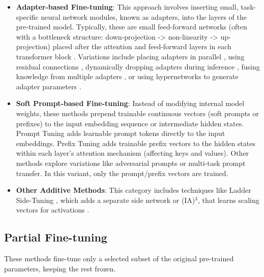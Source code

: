 \begin{itemize}
    \item \textbf{Adapter-based Fine-tuning}: This approach involves inserting small, task-specific neural network modules, known as adapters, into the layers of the pre-trained model. Typically, these are small feed-forward networks (often with a bottleneck structure: down-projection -> non-linearity -> up-projection) placed after the attention and feed-forward layers in each transformer block \cite{houlsby2019parameterefficient}. Variations include placing adapters in parallel \cite{he2021unified}, using residual connections \cite{Lin_2020}, dynamically dropping adapters during inference \cite{ruckle-etal-2021-adapterdrop}, fusing knowledge from multiple adapters \cite{pfeiffer-etal-2021-adapterfusion}, or using hypernetworks to generate adapter parameters \cite{he2022hyperprompt}.

    \item \textbf{Soft Prompt-based Fine-tuning}: Instead of modifying internal model weights, these methods prepend trainable continuous vectors (soft prompts or prefixes) to the input embedding sequence or intermediate hidden states. Prompt Tuning \cite{lester-etal-2021-power} adds learnable prompt tokens directly to the input embeddings. Prefix Tuning \cite{li-liang-2021-prefix} adds trainable prefix vectors to the hidden states within each layer's attention mechanism (affecting keys and values). Other methods explore variations like adversarial prompts or multi-task prompt transfer. In this variant, only the prompt/prefix vectors are trained.

    \item \textbf{Other Additive Methods}: This category includes techniques like Ladder Side-Tuning \cite{sung2022lst}, which adds a separate side network or (IA)\(^3\), that learns scaling vectors for activations \cite{liu2022fewshot}.
\end{itemize}

\subsection{Partial Fine-tuning}
These methods fine-tune only a selected subset of the original pre-trained parameters, keeping the rest frozen.

